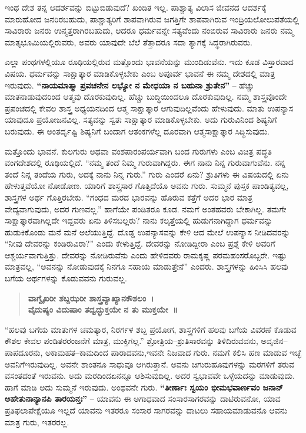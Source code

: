 ಇಂಥ ದೇಶ ತನ್ನ ಆದರ್ಶವನ್ನು ಬಿಟ್ಟುಬಿಡುವುದೆ? ಖಂಡಿತ ಇಲ್ಲ. ಪಾಶ್ಚಾತ್ಯ ವಿಲಾಸ ಜೀವನದ ಆದರ್ಶಕ್ಕೆ ಮಾರುಹೋದ ಜನರಿರಬಹುದು, ಪಾಶ್ಚಾತ್ಯರಿಗೆ ಶಾಪವಾಗಿರುವ ಜಗತ್ತಿಗೇ ಶಾಪವಾಗಿರುವ ಇಂದ್ರಿಯಲೋಲುಪತೆಯಲ್ಲಿ ಸಾವಿರಾರು ಜನರು ಉನ್ಮತ್ತರಾಗಿರಬಹುದು, ಆದರೂ ಧರ್ಮವನ್ನೇ ಸತ್ಯವೆಂದು ನಂಬಿರುವ ಸಾವಿರಾರು ಜನರು ನಮ್ಮ ಮಾತೃಭೂಮಿಯಲ್ಲಿರುವರು, ಅವರು ಯಾವುದೇ ಬೆಲೆ ತೆತ್ತಾದರೂ ಸದಾ ತ್ಯಾಗಕ್ಕೆ ಸಿದ್ಧರಾಗಿರುವರು.

ಎಲ್ಲಾ ಪಂಥಗಳಲ್ಲಿಯೂ ರೂಢಿಯಲ್ಲಿರುವ ಮತ್ತೊಂದು ಭಾವನೆಯನ್ನು ಮುಂದಿಡುವೆನು. ಇದು ಕೂಡ ವಿಸ್ತಾರವಾದ ವಿಷಯ. ಧರ್ಮವನ್ನು ಸಾಕ್ಷಾತ್ಕಾರ ಮಾಡಿಕೊಳ್ಳಬೇಕು ಎಂಬ ಅಪೂರ್ವ ಭಾವನೆ ಈ ನಮ್ಮ ದೇಶದಲ್ಲಿ ಮಾತ್ರ ಇರುವುದು. \textbf{“ನಾಯಮಾತ್ಮಾ ಪ್ರವಚನೇನ ಲಭ್ಯೋ ನ ಮೇಧಯಾ ನ ಬಹುನಾ ಶ್ರುತೇನ”} – ಹೆಚ್ಚು ಮಾತನಾಡುವುದರಿಂದ ಆತ್ಮವು ದೊರಕುವುದಿಲ್ಲ. ಹೆಚ್ಚು ಬುದ್ಧಿಯಿಂದಲೂ ದೊರಕುವುದಿಲ್ಲ. ನಮ್ಮ ಶಾಸ್ತ್ರವೊಂದೇ ಪ್ರಪಂಚದಲ್ಲಿ ಕೇವಲ ಶಾಸ್ತ್ರ ಅಧ್ಯಯನದಿಂದ ಆತ್ಮ ಸಾಕ್ಷಾತ್ಕಾರ ಆಗುವುದಿಲ್ಲವೆಂದು ಹೇಳುವುದು. ಮಾತು ಉಪನ್ಯಾಸ ಯಾವುದೂ ಪ್ರಯೋಜನವಿಲ್ಲ. ಸತ್ಯವನ್ನು ಸ್ವತಃ ಸಾಕ್ಷಾತ್ಕಾರ ಮಾಡಿಕೊಳ್ಳಬೇಕು. ಅದು ಗುರುವಿನಿಂದ ಶಿಷ್ಯನಿಗೆ ಬರುವುದು. ಈ ಅಂತರ್ದೃಷ್ಟಿ ಶಿಷ್ಯನಿಗೆ ಬಂದಾಗ ಆತಂಕಗಳೆಲ್ಲ ದೂರವಾಗಿ ಆತ್ಮಸಾಕ್ಷಾತ್ಕಾರ ಸಿದ್ಧಿಸುವುದು.

ಮತ್ತೊಂದು ಭಾವನೆ. ಕುಲಗುರು ಅಥವಾ ವಂಶಪಾರಂಪರ್ಯವಾಗಿ ಬಂದ ಗುರುಗಳು ಎಂಬ ವಿಚಿತ್ರ ಪದ್ಧತಿ ವಂಗದೇಶದಲ್ಲಿ ರೂಢಿಯಲ್ಲಿದೆ. “ನಮ್ಮ ತಂದೆ ನಿಮ್ಮ ಗುರುವಾಗಿದ್ದರು. ಈಗ ನಾನು ನಿನ್ನ ಗುರುವಾಗುವೆನು. ನನ್ನ ತಂದೆ ನಿನ್ನ ತಂದೆಯ ಗುರು, ಅದಕ್ಕೆ ನಾನು ನಿನ್ನ ಗುರು.” ಗುರು ಎಂದರೆ ಏನು? ಶ್ರುತಿಗಳು ಈ ವಿಷಯದಲ್ಲಿ ಏನು ಹೇಳುತ್ತವೆಯೋ ನೋಡೋಣ. ಯಾರಿಗೆ ಶಾಸ್ತ್ರಸಾರ ಗೊತ್ತಿದೆಯೊ ಅವನು ಗುರು. ಸುಮ್ಮನೆ ಪುಸ್ತಕ ಪಾಂಡಿತ್ಯವಲ್ಲ, ಶಾಸ್ತ್ರಗಳ ಅರ್ಥ ಗೊತ್ತಿರಬೇಕು. “ಗಂಧದ ಮರದ ಭಾರವನ್ನು ಹೊರುವ ಕತ್ತೆಗೆ ಅದರ ಭಾರ ಮಾತ್ರ ವೇದ್ಯವಾಗುವುದು, ಅದರ ಗುಣವಲ್ಲ.” ಹಾಗೆಯೇ ಪಂಡಿತರೂ ಕೂಡ. ನಮಗೆ ಅಂತಹವರು ಬೇಕಾಗಿಲ್ಲ. ತಮಗೇ ಸಾಕ್ಷಾತ್ಕಾರವಾಗಿಲ್ಲದೇ ಇದ್ದವರು ಏನು ತಿಳಿಸಬಲ್ಲರು? ನಾನು ಕಲ್ಕತ್ತೆಯಲ್ಲಿ ಹುಡುಗನಾಗಿದ್ದಾಗ ಧರ್ಮವನ್ನು ಹುಡುಕಿಕೊಂಡು ಮನೆ ಮನೆ ಅಲೆಯುತ್ತಿದ್ದೆ. ದೊಡ್ಡ ಉಪನ್ಯಾಸವನ್ನು ಕೇಳಿ ಆದ ಮೇಲೆ ಉಪನ್ಯಾಸ ನೀಡಿದವರನ್ನು “ನೀವು ದೇವರನ್ನು ಕಂಡಿರು\-ವಿರಾ?” ಎಂದು ಕೇಳುತ್ತಿದ್ದೆ. ದೇವರನ್ನು ನೋಡಿದ್ದೀರಾ ಎಂಬ ಪ್ರಶ್ನೆ ಕೇಳಿ ಅವರಿಗೆ ಆಶ್ಚರ್ಯವಾಗುತ್ತಿತ್ತು. ದೇವರನ್ನು ನೋಡಿರುವೆನು ಎಂದು ಹೇಳಿ\break ದವರು ರಾಮಕೃಷ್ಣ ಪರಮಹಂಸರೊಬ್ಬರೇ. ಇಷ್ಟು ಮಾತ್ರವಲ್ಲ, “ಅವನನ್ನು ನೋಡುವುದಕ್ಕೆ ನಿನಗೂ ಸಹಾಯ ಮಾಡುತ್ತೇನೆ” ಎಂದರು. ಶಾಸ್ತ್ರಗಳನ್ನು ಹಿಂಸಿಸಿ ಹಲವು ಬಗೆಯ ಅರ್ಥಗಳನ್ನು ಕೊಡುವವನು ಗುರುವಲ್ಲ.

\begin{verse}
\textbf{ವಾಗ್ವೈಖರೀ ಶಬ್ದಝರೀ ಶಾಸ್ತ್ರವ್ಯಾಖ್ಯಾನಕೌಶಲಂ~।}\\\textbf{ವೈದುಷ್ಯಂ ವಿದುಷಾಂ ತದ್ವದ್ಭುಕ್ತಯೇ ನ ತು ಮುಕ್ತಯೇ~॥}
\end{verse}

“ಹಲವು ಬಗೆಯ ಮಾತುಗಳ ಚಮತ್ಕಾರ, ನಿರರ್ಗಳ ಶಬ್ದ ಪ್ರಯೋಗ, ಶಾಸ್ತ್ರಗಳಿಗೆ ಹಲವು ಬಗೆಯ ವಿವರಣೆ ಕೊಡುವ ಕೌಶಲ ಕೇವಲ ಪಂಡಿತರ\break ರಂಜನೆಗೆ ಮಾತ್ರ, ಮುಕ್ತಿಗಲ್ಲ.” ಶ್ರೋತ್ರಿಯ–ಶ್ರುತಿಸಾರವನ್ನು ತಿಳಿದಿರುವವನು, ಅವೃಜಿನ–ಪಾಪದೂರನು, ಅಕಾಮಹತ–ಕಾಮದಿಂದ ಪಾರಾದವನು,\break ಇವನೇ ನಿಜವಾದ ಗುರು. ನಮಗೆ ಕಲಿಸಿ ಹಣ ಮಾಡುವ ಇಚ್ಛೆ ಅವನಿಗೆ\break ಇರುವುದಿಲ್ಲ. ಅವನೇ ಶಾಂತನೂ ಸಾಧುವೂ ಆಗಿರುತ್ತಾನೆ. ಅವನು ಚಿಗುರು\break ಹೂವುಗಳನ್ನು ಮರಗಳಿಗೆ ತರುವ ವಸಂತದಂತೆ ಇರುವನು. ಅದು ಮರದಿಂದ\break ಏನನ್ನೂ ಆಶಿಸುವುದಿಲ್ಲ. ಅದರ ಸ್ವಭಾವವೇ ಒಳ್ಳೆಯದನ್ನು ಮಾಡುವುದು. ಹಾಗೆ ಮಾಡಿ ಅದು ಸುಮ್ಮನೆ ಇರುವುದು. ಅಂಥವನೇ ಗುರು. \textbf{“ತೀರ್ಣಾಃ ಸ್ವಯಂ ಭೀಮಭವಾರ್ಣವಂ ಜನಾನ್​ ಅಹೇತುನಾನ್ಯಾನಪಿ ತಾರಯನ್ತಃ”} – ಯಾವನು ಈ ಅಗಾಧವಾದ ಸಂಸಾರಸಾಗರವನ್ನು ದಾಟಿರುವನೋ, ಯಾವ ಪ್ರತಿಫಲಾಪೇಕ್ಷೆಯೂ ಇಲ್ಲದೆ ಯಾವನು ಇತರರೂ ಸಂಸಾರ ಸಾಗರವನ್ನು ದಾಟಲು ಸಹಾಯಮಾಡುವನೊ ಆವನು ಮಾತ್ರ ಗುರು, ಇತರರಲ್ಲ.

